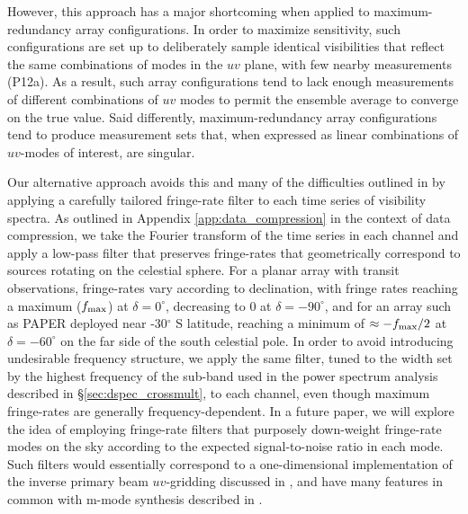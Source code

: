 \documentclass[twocolumn,apj,numberedappendix]{emulateapj}
\begin{document}
However, this approach has a major shortcoming when applied to maximum-redundancy array configurations.
In order
to maximize sensitivity, such
configurations are set up to deliberately sample identical visibilities that reflect the same 
combinations of modes in the $uv$ plane, with few nearby measurements (P12a).  As a result,
such array configurations tend to lack enough measurements of different combinations of $uv$ modes
to permit the ensemble average to converge on the true value.  Said differently, maximum-redundancy
array configurations tend to produce measurement sets that, when expressed as linear combinations
of $uv$-modes of interest, are singular.

Our alternative approach avoids this and many of the difficulties outlined
in \citet{hazelton_et_al2013} by applying a carefully tailored
fringe-rate filter to each time series of visibility spectra.  As outlined in Appendix \ref{app:data_compression}
in the context of data compression, we
take the Fourier transform of the time series in each channel and apply a low-pass filter that preserves
fringe-rates that geometrically correspond to sources rotating on the celestial sphere.  
For a planar array with transit observations, fringe-rates vary according to declination, with fringe rates
reaching a maximum ($f_{\rm max}$) at 
$\delta=0^\circ$, decreasing to 0 at $\delta=-90^\circ$, and for an array such as PAPER deployed near
-30$^\circ$ S latitude, reaching a minimum of $\approx-f_{\rm max}/2$ at $\delta=-60^\circ$ on
the far side of the south celestial pole.
In order to
avoid introducing undesirable frequency structure, we apply the same filter, tuned to the width
set by the highest frequency of the sub-band used in the
power spectrum analysis described
in \S\ref{sec:dspec_crossmult}, to each channel,
even though maximum fringe-rates are generally frequency-dependent.
In a future paper, we will explore the idea
of employing fringe-rate filters that purposely down-weight fringe-rate modes on the sky according to
the expected signal-to-noise ratio in each mode.  Such filters would essentially correspond to a
one-dimensional implementation of the inverse primary beam $uv$-gridding discussed in \citet{morales_matejek2009},
and have many features in common with m-mode synthesis described in \citet{shaw_et_al2013}.
\end{document}
